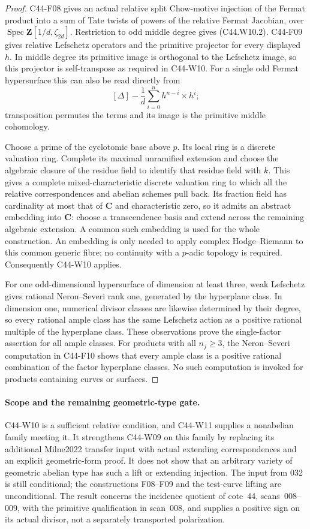\documentclass[11pt]{article}
\theoremstyle{remark}\newtheorem{remark}[theorem]{Remark}
\begin{document}
\begin{proof}
C44-F08 gives an actual relative split Chow-motive injection of
the Fermat product into a sum of Tate twists of powers of the
relative Fermat Jacobian, over
$\operatorname{Spec}\mathbf Z[1/d,\zeta_{2d}]$.
Restriction to odd middle degree gives (C44.W10.2). C44-F09 gives
relative Lefschetz operators and the primitive projector for every
displayed $h$. In middle degree its primitive image is orthogonal
to the Lefschetz image, so this projector is self-transpose as
required in C44-W10. For a single odd Fermat hypersurface this can
also be read directly from
\[
 [\Delta]-\frac1d\sum_{i=0}^{n}h^{n-i}\times h^i;
\]
transposition permutes the terms and its image is the primitive
middle cohomology.

Choose a prime of the cyclotomic base above $p$. Its local ring is
a discrete valuation ring. Complete its maximal unramified
extension and choose the algebraic closure of the residue field
to identify that residue field with $k$. This gives a complete
mixed-characteristic discrete valuation ring to which all the
relative correspondences and abelian schemes pull back. Its
fraction field has cardinality at most that of $\mathbf C$ and
characteristic zero, so it admits an abstract embedding into
$\mathbf C$: choose a transcendence basis and extend across the
remaining algebraic extension. A common such embedding is used
for the whole construction. An embedding is only needed to apply
complex Hodge--Riemann to this common generic fibre; no continuity
with a $p$-adic topology is required. Consequently C44-W10 applies.

For one odd-dimensional hypersurface of dimension at least three,
weak Lefschetz gives rational Neron--Severi rank one, generated by
the hyperplane class. In dimension one, numerical divisor classes
are likewise determined by their degree, so every rational ample
class has the same Lefschetz action as a positive rational multiple
of the hyperplane class. These observations prove the single-factor
assertion for all ample classes. For products with all $n_j\geq3$,
the Neron--Severi computation in C44-F10 shows that every ample
class is a positive rational combination of the factor hyperplane
classes. No such computation is invoked for products containing
curves or surfaces.
\end{proof}

\paragraph{Scope and the remaining geometric-type gate.}
C44-W10 is a sufficient relative condition, and C44-W11 supplies a
nonabelian family meeting it. It strengthens C44-W09 on this family
by replacing its additional Milne2022 transfer input with actual
extending correspondences and an explicit geometric-form proof.
It does not show that an arbitrary variety of geometric abelian
type has such a lift or extending injection. The input from 032
is still conditional; the constructions F08--F09 and the test-curve
lifting are unconditional. The result concerns the incidence
quotient of cote~44, scans~008--009, with the primitive qualification
in scan~008, and supplies a positive sign on its actual divisor,
not a separately transported polarization.
\end{document}
